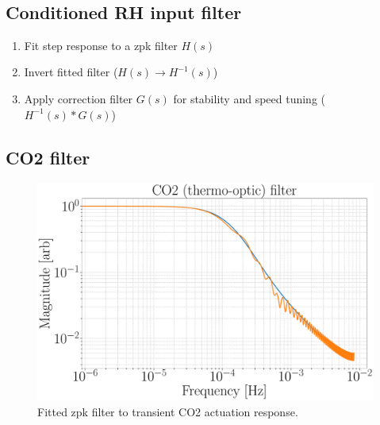 ~\cite{ramette:2016}


\subsection{Conditioned RH input filter}
\begin{enumerate}	
	\item Fit step response to a zpk filter $H(s)$ 
	\item Invert fitted filter ($H(s) \rightarrow H^{-1}(s)$) 
	\item Apply correction filter $G(s)$ for stability and speed tuning ($H^{-1}(s)*G(s)$)
\end{enumerate}


\subsection{CO2 filter}
\begin{figure}[H]
\includegraphics[width=\textwidth]{figs/TCS/CO2_zpk.pdf}
\caption{Fitted zpk filter to transient CO2 actuation response.}
\label{fig:co2_zpk_fit}
\end{figure}

